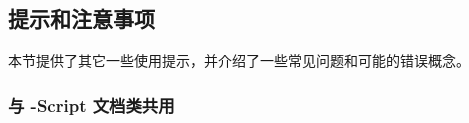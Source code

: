 \subsection{提示和注意事项}
\label{use:cav}

本节提供了其它一些使用提示，并介绍了一些常见问题和可能的错误概念。

\subsubsection{与 -Script 文档类共用}
\label{use:cav:scr}



